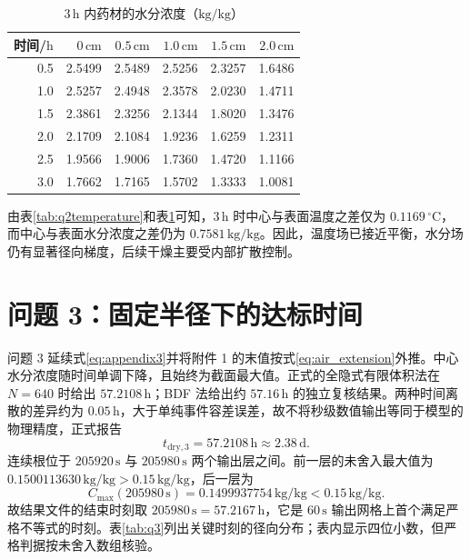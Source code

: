 \documentclass[UTF8,a4paper,zihao=-4,fontset=fandol]{ctexart}
\newcommand{\unit}[1]{\,\mathrm{#1}}
\begin{document}
\begin{table}[H]
\centering
\caption{$3\unit{h}$ 内药材的水分浓度（$\mathrm{kg/kg}$）}
\label{tab:q2moisture}
\small
\begin{tabular}{rrrrrr}
\toprule
时间/$\mathrm{h}$ & $0\unit{cm}$ & $0.5\unit{cm}$ & $1.0\unit{cm}$ & $1.5\unit{cm}$ & $2.0\unit{cm}$ \\
\midrule
0.5 & 2.5499 & 2.5489 & 2.5256 & 2.3257 & 1.6486 \\
1.0 & 2.5257 & 2.4948 & 2.3578 & 2.0230 & 1.4711 \\
1.5 & 2.3861 & 2.3256 & 2.1344 & 1.8020 & 1.3476 \\
2.0 & 2.1709 & 2.1084 & 1.9236 & 1.6259 & 1.2311 \\
2.5 & 1.9566 & 1.9006 & 1.7360 & 1.4720 & 1.1166 \\
3.0 & 1.7662 & 1.7165 & 1.5702 & 1.3333 & 1.0081 \\
\bottomrule
\end{tabular}
\end{table}

由表\ref{tab:q2temperature}和表\ref{tab:q2moisture}可知，$3\unit{h}$ 时中心与表面温度之差仅为 $0.1169\,^{\circ}\mathrm{C}$，而中心与表面水分浓度之差仍为 $0.7581\unit{kg/kg}$。因此，温度场已接近平衡，水分场仍有显著径向梯度，后续干燥主要受内部扩散控制。

\section{问题 3：固定半径下的达标时间}

问题 3 延续式\eqref{eq:appendix3}并将附件 1 的末值按式\eqref{eq:air_extension}外推。中心水分浓度随时间单调下降，且始终为截面最大值。正式的全隐式有限体积法在 $N=640$ 时给出 $57.2108\unit{h}$；BDF 法给出约 $57.16\unit{h}$ 的独立复核结果。两种时间离散的差异约为 $0.05\unit{h}$，大于单纯事件容差误差，故不将秒级数值输出等同于模型的物理精度，正式报告
\begin{equation}
t_{\mathrm{dry},3}=57.2108\unit{h}\approx2.38\unit{d}.
\end{equation}
连续根位于 $205920\unit{s}$ 与 $205980\unit{s}$ 两个输出层之间。前一层的未舍入最大值为 $0.1500113630\unit{kg/kg}>0.15\unit{kg/kg}$，后一层为
\begin{equation}
C_{\max}(205980\unit{s})=0.1499937754\unit{kg/kg}<0.15\unit{kg/kg}.
\end{equation}
故结果文件的结束时刻取 $205980\unit{s}=57.2167\unit{h}$，它是 $60\unit{s}$ 输出网格上首个满足严格不等式的时刻。表\ref{tab:q3}列出关键时刻的径向分布；表内显示四位小数，但严格判据按未舍入数组核验。
\end{document}
